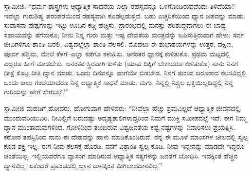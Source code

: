  ಸ್ವಾಮೀಜಿ: “ಧರ್ಮ ಶಾಸ್ತ್ರಗಳು ಆಧ್ಯಾತ್ಮಿಕ ಸಾಧನೆಯ ಎಲ್ಲಾ ರಹಸ್ಯವನ್ನೂ ಒಳಗೊಂಡಿರುವವೆಂದು ತಿಳಿದೆಯಾ? ಇವೆಲ್ಲಾ ಗುರುಶಿಷ್ಯ ಪರಂಪರೆಯಿಂದ ರಹಸ್ಯವಾಗಿ ಕೊಡಲ್ಪಡುತ್ತವೆ. ಬಹು ಎಚ್ಚರಿಕೆಯಿಂದ ಧ್ಯಾನ ಜಪವನ್ನು ಮಾಡು. ಸುವಾಸನಾ ಪುಷ್ಪಗಳನ್ನು ಇಟ್ಟು ಊದಿನ ಕಡ್ಡಿ ಹಚ್ಚಿಸು. ಪ್ರಾರಂಭದಲ್ಲಿ ಮನಸ್ಸು ಪರಿಶುದ್ಧವಾಗಲು ಈ ಬಾಹ್ಯ ಸಹಾಯವನ್ನು ತೆಗೆದುಕೊ; ನೀನು ನಿನ್ನ ಗುರು ಮತ್ತು ಇಷ್ಟ ದೇವತೆಯ ಮಂತ್ರವನ್ನು ಜಪಿಸುತ್ತಿರುವಾಗ ಹೇಳು: ಸರ್ವ ಜೀವಿಗಳಿಗೂ ಶಾಂತಿ ಬರಲಿ, ವಿಶ್ವದಲ್ಲೆಲ್ಲಾ ಶಾಂತಿ ನೆಲಸಲಿ. ಮೊದಲು ಈ ಶುಭಾಶಯಗಳನ್ನು ಉತ್ತರ, ದಕ್ಷಿಣ, ಪೂರ್ವ ಪಶ್ಚಿಮ, ಮೇಲೆ ಕೆಳಗೆ–ಎಲ್ಲಾ ಕಡೆಗೂ ಕಳುಹಿಸು. ಅನಂತರ ಧ್ಯಾನಕ್ಕೆ ಕುಳಿತುಕೊ. ಪ್ರಥಮ ಮಟ್ಟದಲ್ಲಿ ಎಲ್ಲರೂ ಹೀಗೆ ಮಾಡಬೇಕು. ಅನಂತರ ಸ್ಥಿರವಾಗಿ ಕುಳಿತು (ಯಾವ ದಿಕ್ಕಿಗೆ ಬೇಕಾದರೂ ಕುಳಿತುಕೊ) ನಾನು ನಿನಗೆ ದೀಕ್ಷೆ ಕೊಟ್ಟ ರೀತಿ ಧ್ಯಾನ ಮಾಡು. ಒಂದು ದಿನವನ್ನೂ ಹಾಗೆಯೇ ಬಿಡಬೇಡ. ನಿನಗೆ ತುಂಬಾ ಜರೂರಾದ ಕೆಲಸವಿದ್ದಲ್ಲಿ ಒಂದು ಕಾಲು ಗಂಟೆಯಾದರೂ ನಿನ್ನ ಆಧ್ಯಾತ್ಮಿಕ ಸಾಧನೆ ಮಾಡು. ಮಗು, ನಿನ್ನಲ್ಲಿ ನಿಶ್ಚಲ ಭಕ್ತಿಯಿಲ್ಲದಿದ್ದಲ್ಲಿ ನಿನ್ನ ಗುರಿಯನ್ನು ಹೇಗೆ ಸೇರಬಲ್ಲೆ?” 

 ಸ್ವಾಮೀಜಿ ಮಹಡಿಗೆ ಹೋದರು, ಹೋಗುವಾಗ ಹೇಳಿದರು: “ನೀವೆಲ್ಲಾ ಹೆಚ್ಚು ಶ್ರಮವಿಲ್ಲದೆ ಆಧ್ಯಾತ್ಮಿಕ ಜೀವನದಲ್ಲಿ ಮುಂದುವರಿಯುವಿರಿ. ನೀವಿಲ್ಲಿಗೆ ಬರುವಷ್ಟು ಅದೃಷ್ಟಶಾಲಿಗಳಾದ್ದರಿಂದ ನಿಮಗೆ ಮುಕ್ತಿ ಸಮೀಪದಲ್ಲೆ ಇದೆ. ಈಗ ನಿಮ್ಮ ಧ್ಯಾನ ಮುಂತಾದುವುಗಳಿಂದ, ಗೋಳಿನಿಂದ ತುಂಬಿರುವ ವಿಶ್ವಜನತೆಯ ಕಷ್ಟ ನಷ್ಟಗಳನ್ನು ನಿವಾರಿಸಲು ಪ್ರಯತ್ನಿಸಿ. ಕಠೋರ ತಪಸ್ಸಿನಿಂದ ನಾನು ಈ ದೇಹವನ್ನು ಹಾಳು ಮಾಡಿಕೊಂಡಿರುವೆ. ನನ್ನ ಈ ಮೂಳೆ ಮಾಂಸಗಳ ಚೀಲದಲ್ಲಿ ಸ್ವಲ್ಪ ಕೂಡ ಶಕ್ತಿ ಇಲ್ಲ. ಈಗ ನೀವು ಕೆಲಸಕ್ಕೆ ಹೊರಡಿ. ನನಗೆ ವಿಶ್ರಾಂತಿ ಸ್ವಲ್ಪ ಕೊಡಿ. ನೀವು ಇನ್ನೇನನ್ನು ಮಾಡದೇ ಇದ್ದರೂ ಚಿಂತೆಯಿಲ್ಲ. ಇಲ್ಲಿಯವರೆಗೂ ವ್ಯಾಸಂಗ ಮಾಡಿರುವ ಆಧ್ಯಾತ್ಮಿಕ ಸತ್ಯಗಳನ್ನು ಜನತೆಗೆ ಬೋಧಿಸಿ. ಇದಕ್ಕಿಂತ ಹೆಚ್ಚಿನ ಧ್ಯಾನವಿಲ್ಲ. ಏಕೆಂದರೆ ಪ್ರಪಂಚದಲ್ಲಿ ಜ್ಞಾನ ದಾನಕ್ಕಿಂತ ಮಿಗಿಲಾದ\break ದಾನವಿಲ್ಲ.” 

